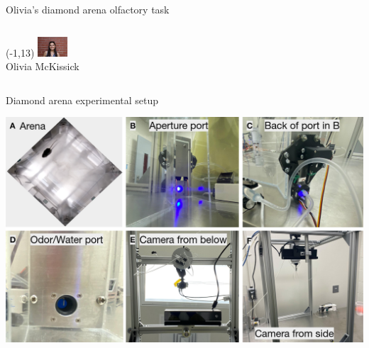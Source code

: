 \documentclass[bigger]{beamer}
\begin{document}
\begin{frame}[label={sec:orgc706323}]{Olivia's diamond arena olfactory task}
\begin{columns}
\begin{column}[t]{0.5\columnwidth}
\begin{textblock}{5}(-1,13)
\center
\includegraphics[width=3em]{img/olivia.jpg}\\
\scriptsize
Olivia McKissick
\end{textblock}
\end{column}
\end{columns}
\end{frame}

\begin{frame}[label={sec:org87a87b9}]{Diamond arena experimental setup}
\begin{center}
\includegraphics[width=.9\linewidth]{img/physical-diamond-arena.png}
\end{center}
\end{frame}
\end{document}
